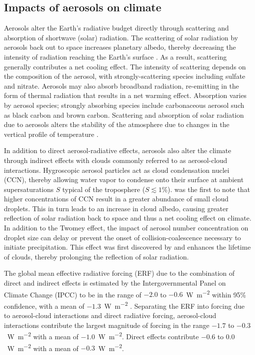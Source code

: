\subsection{Impacts of aerosols on climate}

Aerosols alter the Earth's radiative budget directly through scattering and absorption of shortwave (solar) radiation. The scattering of solar radiation by aerosols back out to space increases planetary albedo, thereby decreasing the intensity of radiation reaching the Earth's surface \parencite{charlson_climate_1969, charlson_climate_1992}. As a result, scattering generally contributes a net cooling effect. The intensity of scattering depends on the composition of the aerosol, with strongly-scattering species including sulfate and nitrate. Aerosols may also absorb broadband radiation, re-emitting in the form of thermal radiation that results in a net warming effect. Absorption varies by aerosol species; strongly absorbing species include carbonaceous aerosol such as black carbon and brown carbon.  Scattering and absorption of solar radiation due to aerosols alters the stability of the atmosphere due to changes in the vertical profile of temperature \parencite{li_scattering_2022, lau_observational_2006}. 

In addition to direct aerosol-radiative effects, aerosols also alter the climate through indirect effects with clouds commonly referred to as aerosol-cloud interactions. Hygroscopic aerosol particles act as cloud condensation nuclei (CCN), thereby allowing water vapor to condense onto their surface at ambient supersaturations $S$ typical of the troposphere ($S\lesssim1\%$). \textcite{twomey_influence_1977} was the first to note that higher concentrations of CCN result in a greater abundance of small cloud droplets. This in turn leads to an increase in cloud albedo, causing greater reflection of solar radiation back to space and thus a net cooling effect on climate. In addition to the Twomey effect, the impact of aerosol number concentration on droplet size can delay or prevent the onset of collision-coalescence necessary to initiate precipitation. This effect was first discovered by \textcite{albrecht_aerosols_1989} and enhances the lifetime of clouds, thereby prolonging the reflection of solar radiation. 


The global mean effective radiative forcing (ERF) due to the combination of direct and indirect effects is estimated by the Intergovernmental Panel on Climate Change (IPCC) to be in the range of $-2.0$ to $-0.6$~\si{W.m^{-2}} within 95\% confidence, with a mean of $-1.3$~\si{W.m^{-2}} \parencite{ipcc_report_2021}. Separating the ERF into forcing due to aerosol-cloud interactions and direct radiative forcing, aerosol-cloud interactions contribute the largest magnitude of forcing in the range $-1.7$ to $-0.3$~\si{W.m^{-2}} with a mean of $-1.0$~\si{W.m^{-2}}. Direct effects contribute $-0.6$ to $0.0$~\si{W.m^{-2}} with a mean of $-0.3$~\si{W.m^{-2}}. 

